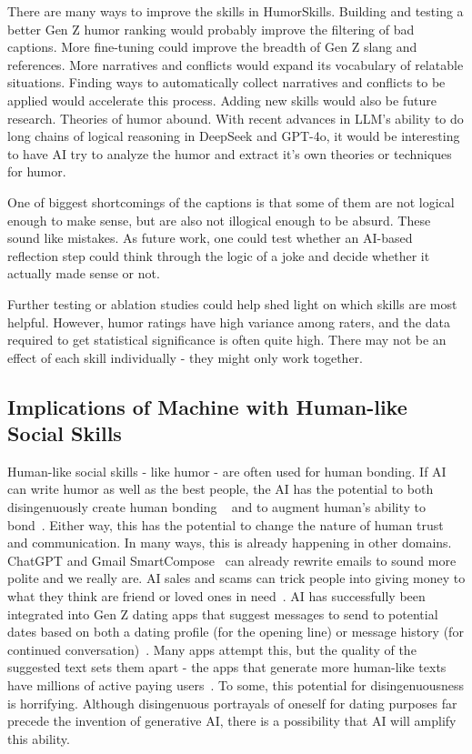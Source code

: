 There are many ways to improve the skills in HumorSkills. Building and testing a better Gen Z humor ranking would probably improve the filtering of bad captions. More fine-tuning could improve the breadth of Gen Z slang and references. More narratives and conflicts would expand its vocabulary of relatable situations. Finding ways to automatically collect narratives and conflicts to be applied would accelerate this process. Adding new skills would also be future research. Theories of humor abound. With recent advances in LLM's ability to do long chains of logical reasoning in DeepSeek and GPT-4o, it would be interesting to have AI try to analyze the humor and extract it's own theories or techniques for humor.

One of biggest shortcomings of the captions is that some of them are not logical enough to make sense, but are also not illogical enough to be absurd. These sound like mistakes. As future work, one could test whether an AI-based reflection step could think through the logic of a joke and decide whether it actually made sense or not. 


Further testing or ablation studies could help shed light on which skills are most helpful. However, humor ratings have high variance among raters, and the data required to get statistical significance is often quite high. There may not be an effect of each skill individually - they might only work together. 



\subsection{Implications of Machine with Human-like Social Skills}
Human-like social skills - like humor - are often used for human bonding. If AI can write humor as well as the best people, the AI has the potential to both disingenuously create human bonding ~\cite{diresta2024spammersscammersleverageaigenerated,naaman_opinion} and to augment human's ability to bond~\cite{socialglue}. Either way, this has the potential to change the nature of human trust and communication.
In many ways, this is already happening in other domains. 
ChatGPT and Gmail SmartCompose~\cite{smartcompose} can already rewrite emails to sound more polite and we really are.
AI sales and scams can trick people into giving money to what they think are friend or loved ones in need~\cite{ai_scams}. 
AI has successfully been integrated into Gen Z dating apps that suggest messages to send to potential dates based on both a dating profile (for the opening line) or message history (for continued conversation)~\cite{majic2024rizz}. Many apps attempt this, but the quality of the suggested text sets them apart - the apps that generate more human-like texts have millions of active paying users~\cite{majic2024rizz}.
To some, this potential for disingenuousness is horrifying. Although disingenuous portrayals of oneself for dating purposes far precede the invention of generative AI, there is a possibility that AI will amplify this ability. 



